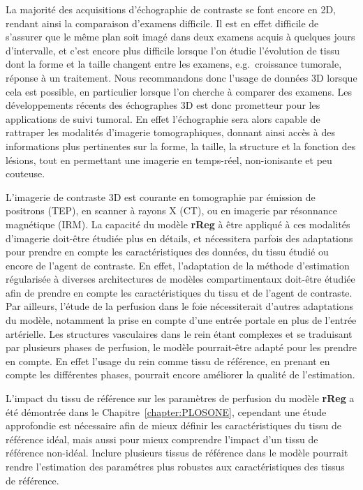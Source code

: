 \begin{otherlanguage}{francais}
La majorit\'e des acquisitions d'\'echographie de contraste se font encore en 2D, rendant ainsi la comparaison d'examens difficile.
Il est en effet difficile de s'assurer que le m\^eme plan soit imag\'e dans deux examens acquis \`a quelques jours d'intervalle, et c'est encore plus difficile lorsque l'on \'etudie l'\'evolution de tissu dont la forme et la taille changent entre les examens, e.g.~croissance tumorale, r\'eponse \`a un traitement.
Nous recommandons donc l'usage de donn\'ees 3D lorsque cela est possible, en particulier lorsque l'on cherche \`a comparer des examens.
Les d\'eveloppements r\'ecents des \'echographes 3D est donc prometteur pour les applications de suivi tumoral.
En effet l'\'echographie sera alors capable de rattraper les modalit\'es d'imagerie tomographiques, donnant ainsi acc\`es \`a des informations plus pertinentes sur la forme, la taille, la structure et la fonction des l\'esions, tout en permettant une imagerie en temps-r\'eel, non-ionisante et peu couteuse.

L'imagerie de contraste 3D est courante en tomographie par \'emission de positrons (TEP), en scanner \`a rayons X (CT), ou en imagerie par r\'esonnance magn\'etique (IRM).
La capacit\'e du mod\`ele \textbf{rReg} \`a \^etre appliqu\'e \`a ces modalit\'es d'imagerie doit-\^etre \'etudi\'ee plus en d\'etails, et n\'ecessitera parfois des adaptations pour prendre en compte les caract\'eristiques des donn\'ees, du tissu \'etudi\'e ou encore de l'agent de contraste.
En effet, l'adaptation de la m\'ethode d'estimation r\'egularis\'ee \`a diverses architectures de mod\`eles compartimentaux doit-\^etre \'etudi\'ee afin de prendre en compte les caract\'eristiques du tissu et de l'agent de contraste.
Par ailleurs, l'\'etude de la perfusion dans le foie n\'ecessiterait d'autres adaptations du mod\`ele, notamment la prise en compte d'une entr\'ee portale en plus de l'entr\'ee art\'erielle.
Les structures vasculaires dans le rein \'etant complexes et se traduisant par plusieurs phases de perfusion, le mod\`ele pourrait-\^etre adapt\'e pour les prendre en compte.
En effet l'usage du rein comme tissu de r\'ef\'erence, en prenant en compte les diff\'erentes phases, pourrait encore am\'eliorer la qualit\'e de l'estimation.

L'impact du tissu de r\'ef\'erence sur les param\`etres de perfusion du mod\`ele \textbf{rReg} a \'et\'e d\'emontr\'ee dans le Chapitre~\ref{chapter:PLOSONE}, cependant une \'etude approfondie est n\'ecessaire afin de mieux d\'efinir les caract\'eristiques du tissu de r\'ef\'erence id\'eal, mais aussi pour mieux comprendre l'impact d'un tissu de r\'ef\'erence non-id\'eal.
Inclure plusieurs tissus de r\'ef\'erence dans le mod\`ele pourrait rendre l'estimation des param\'etres plus robustes aux caract\'eristiques des tissus de r\'ef\'erence.


\end{otherlanguage}
